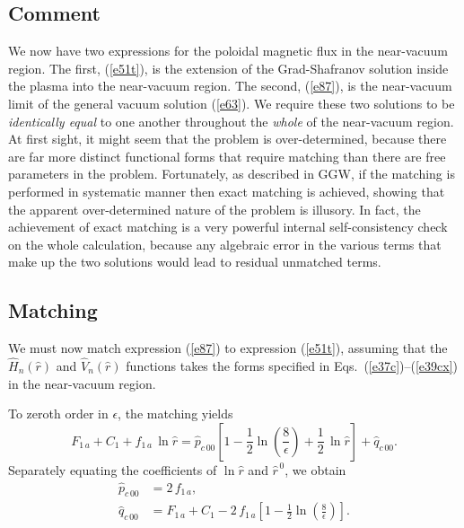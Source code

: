 \documentclass[12pt,prb,aps]{revtex4-1}
\begin{document}
\subsection{Comment}\label{sc}
We now have two expressions for the poloidal magnetic flux in the near-vacuum region. The first, (\ref{e51t}), is the extension of the Grad-Shafranov
solution inside the plasma into the near-vacuum region. The second, (\ref{e87}), is the near-vacuum limit of the general vacuum solution (\ref{e63}). 
We require these two solutions to be {\em identically equal}\/ to one another throughout the {\em whole}\/ of the near-vacuum region. At first sight, it might seem that
the problem is over-determined,\cite{goed} because there are far more distinct functional forms that require matching than there are free parameters in the problem. 
Fortunately, as described in GGW, if the matching is performed in systematic manner then exact matching is achieved, showing that the apparent over-determined nature of the problem is illusory. In fact, the achievement of exact matching is a very powerful internal self-consistency check on the 
whole calculation, because any algebraic error in the various terms that make up the two solutions would lead to residual unmatched terms. 

\subsection{Matching}\label{smatch}
We must now match expression (\ref{e87}) to expression (\ref{e51t}), assuming that the $\hat{H}_n(\hat{r})$ and
$\hat{V}_n(\hat{r})$ functions takes the forms specified in Eqs.~(\ref{e37c})--(\ref{e39cx}) in the near-vacuum region.

To zeroth order in $\epsilon$, the matching yields 
\begin{equation}
F_{1\,a}+C_1 + f_{1\,a}\,\ln\hat{r} =\hat{p}_{c\,00} \left[1-\frac{1}{2}\ln\left(\frac{8}{\epsilon}\right)+\frac{1}{2}\,\ln\hat{r}\right]+\hat{q}_{c\,00}.
\end{equation}
Separately equating the coefficients of $\ln\hat{r}$ and $\hat{r}^{\,0}$, we obtain\,\cite{greene}
\begin{align}
\hat{p}_{c\,00} &= 2\,f_{1\,a},\\[0.5ex]
\hat{q}_{c\,00} &= F_{1\,a}+C_1 -2\,f_{1\,a}\left[1-\frac{1}{2}\ln\left(\frac{8}{\epsilon}\right)\right].\label{e97e}
\end{align}
\end{document}

